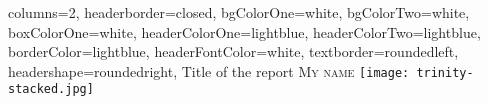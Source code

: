 \documentclass[a0paper,portrait]{baposter}
\newtheorem{theorem*}{Theorem}
\begin{document}
\begin{poster}
{
columns=2,
headerborder=closed, %
bgColorOne=white, %
bgColorTwo=white, %
boxColorOne=white, %
headerColorOne=lightblue, %
headerColorTwo=lightblue, %
borderColor=lightblue, %
headerFontColor=white, %
textborder=roundedleft, %
headershape=roundedright, %
}
{}%
{Title of the report}
{\medskip\textsc{My name}}
{\texttt{[image: trinity-stacked.jpg]}}







\end{poster}
\end{document}
